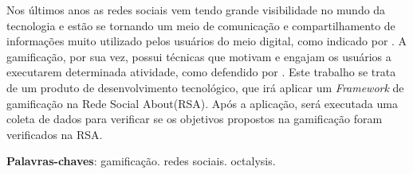 \begin{resumo}
    Nos últimos anos as redes sociais vem tendo grande visibilidade no
    mundo da tecnologia e estão se tornando um meio de comunicação e
    compartilhamento de informações muito utilizado pelos usuários do
    meio digital, como indicado por \cite{socialnetworkdefinition}. A
    gamificação, por sua vez, possui técnicas que motivam e engajam
    os usuários a executarem determinada atividade, como defendido por
    \cite{deterding2011gamification}. Este trabalho se trata de um produto
    de desenvolvimento tecnológico, que irá aplicar um \textit{Framework}
    de gamificação na Rede Social About(RSA). Após a aplicação, será executada
    uma coleta de dados para verificar se os objetivos propostos na gamificação
    foram verificados na RSA.


    \vspace{\onelineskip}

    \noindent
    \textbf{Palavras-chaves}: gamificação. redes sociais. octalysis.
\end{resumo}

